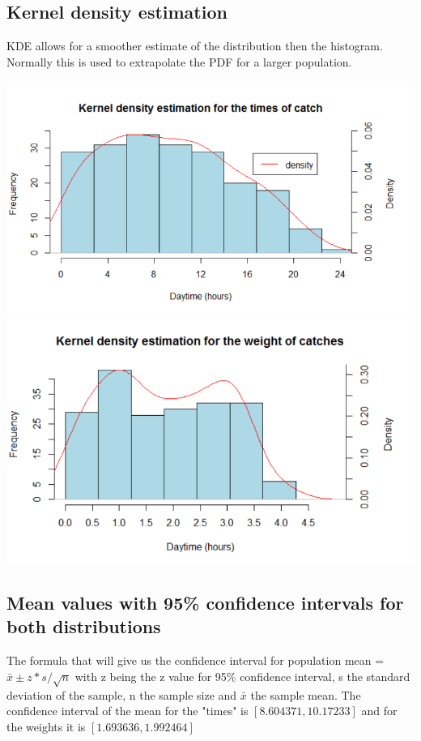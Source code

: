 \documentclass[12pt]{article} %
\begin{document}
\subsection{Kernel density estimation}
KDE allows for a smoother estimate of the distribution then the histogram. Normally this is used to extrapolate the PDF for a larger population.\cite{Kernel_density_estimation}\\\cite{Probability_density_function}\\
\includegraphics[scale=.4]{times_density}
\includegraphics[scale=.4]{weights_density}
\subsection{Mean values with 95\% confidence intervals for both distributions}
The formula that will give us the confidence interval for population mean = $\bar{x}\pm z*s/\sqrt{n}$ with z being the z value for 95\% confidence interval, s the standard deviation of the sample, n the sample size and $\bar{x}$ the sample mean.
The confidence interval of the mean for the "times" is $[8.604371,10.17233]$ and for the weights it is $[1.693636,1.992464]$
\cite{Confidence_interval}\cite{Confidence_intervals_for_means}
\end{document}
